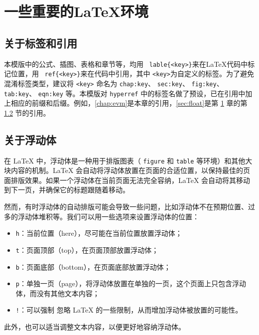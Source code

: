 \chapter{一些重要的\LaTeX{}环境}\label{chap:evm}

\section{关于标签和引用}

本模版中的公式、插图、表格和章节等，均用 \texttt{ lable\{<key>\}}来在\LaTeX{}代码中标记位置，用 \texttt{ ref\{<key>\}}来在代码中引用，其中 \texttt{<key>}为自定义的标签。为了避免混淆标签类型，建议将 \texttt{<key>} 命名为 \texttt{chap:key}、 \texttt{sec:key}、 \texttt{fig:key}、 \texttt{tab:key}、 \texttt{eqn:key} 等。本模版对 \texttt{hyperref} 中的标签名做了预设，已在引用中加上相应的前缀和后缀。例如，\autoref{chap:evm}是本章的引用，\autoref{sec:float}是第 \ref{chap:evm} 章的第 \ref{sec:float} 节的引用。

\section{关于浮动体}\label{sec:float}

在 \LaTeX{} 中，浮动体是一种用于排版图表（ \texttt{figure} 和 \texttt{table} 等环境）和其他大块内容的机制。\LaTeX{} 会自动将浮动体放置在页面的合适位置，以保持最佳的页面排版效果。如果一个浮动体在当前页面无法完全容纳，\LaTeX{} 会自动将其移动到下一页，并确保它的标题跟随着移动。

然而，有时浮动体的自动排版可能会导致一些问题，比如浮动体不在预期位置、过多的浮动体堆积等。我们可以用一些选项来设置浮动体的位置： 
\begin{itemize}
    \item \texttt{h}：当前位置（here），尽可能在当前位置放置浮动体；
    \item \texttt{t}：页面顶部（top），在页面顶部放置浮动体；
    \item \texttt{b}：页面底部（bottom），在页面底部放置浮动体；
    \item \texttt{p}：单独一页（page），将浮动体放置在单独的一页，这个页面上只包含浮动体，而没有其他文本内容；
    \item \texttt{!}：可以强制 忽略 \LaTeX{} 的一些限制，从而增加浮动体被放置的可能性。
\end{itemize}
此外，也可以适当调整文本内容，以便更好地容纳浮动体。

